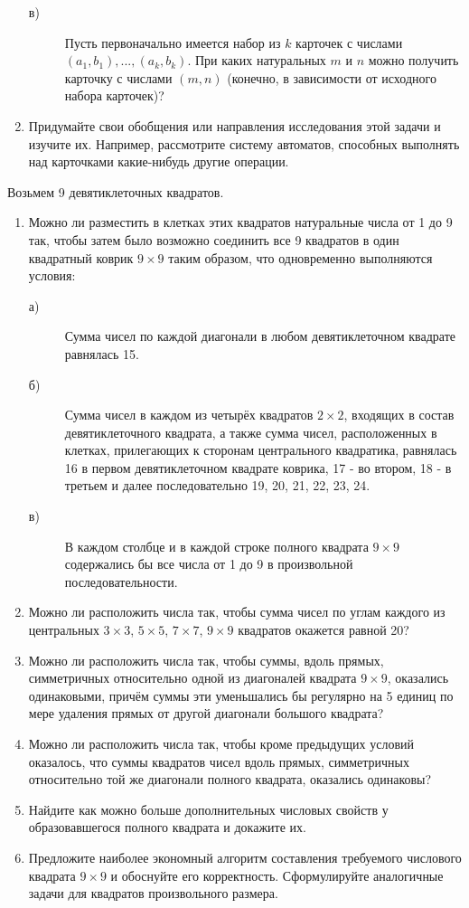 \begin{enumerate}
\begin{description}
    \item [в) ]Пусть первоначально имеется набор из $k$ карточек с числами $(a_1,b_1),...,(a_k, b_k)$. При каких натуральных $m$ и $n$ можно получить карточку с числами $(m, n)$ (конечно, в зависимости от исходного набора карточек)?
    \end{description}
\item Придумайте свои обобщения или направления исследования этой задачи и изучите их. Например, рассмотрите систему автоматов, способных выполнять над карточками какие-нибудь другие операции.
\end{enumerate}

Возьмем 9 девятиклеточных квадратов. \\
\begin{enumerate}
\item Можно ли разместить в клетках этих квадратов натуральные числа от 1 до 9 так, чтобы затем было возможно соединить все 9 квадратов в один квадратный коврик  $9\times9$ таким образом, что одновременно выполняются условия:
     \begin{description}
      \item [а) ]Сумма чисел по каждой диагонали в любом девятиклеточном квадрате равнялась 15.
      \item [б) ]Сумма чисел в каждом из четырёх квадратов $2\times2$, входящих в состав девятиклеточного квадрата, а также сумма чисел, расположенных в клетках,         прилегающих к сторонам центрального квадратика, равнялась 16 в первом девятиклеточном квадрате коврика, 17 - во втором, 18 - в третьем и далее последовательно 19, 20, 21, 22, 23, 24.
      \item [в) ]В каждом столбце и в каждой строке полного квадрата $9\times9$ содержались бы все числа от 1 до 9 в произвольной последовательности.\\
    \end{description}
\item Можно ли расположить числа так, чтобы сумма чисел по углам каждого из центральных $3\times3$, $5\times5$, $7\times7$, $9\times9$ квадратов окажется равной 20?
\item Можно ли расположить числа так, чтобы суммы, вдоль прямых, симметричных относительно одной из диагоналей квадрата $9\times9$, оказались одинаковыми, причём суммы эти уменьшались бы регулярно на 5 единиц по мере удаления прямых от другой диагонали большого квадрата?
\item Можно ли расположить числа так, чтобы кроме предыдущих условий оказалось, что суммы квадратов чисел вдоль прямых, симметричных относительно той же диагонали полного квадрата, оказались одинаковы?
\item Найдите как можно больше дополнительных числовых свойств у образовавшегося полного квадрата и докажите их.
\item Предложите наиболее экономный алгоритм составления требуемого числового квадрата $9\times 9$ и обоснуйте его корректность. Сформулируйте аналогичные задачи для квадратов произвольного размера.
\end{enumerate}


